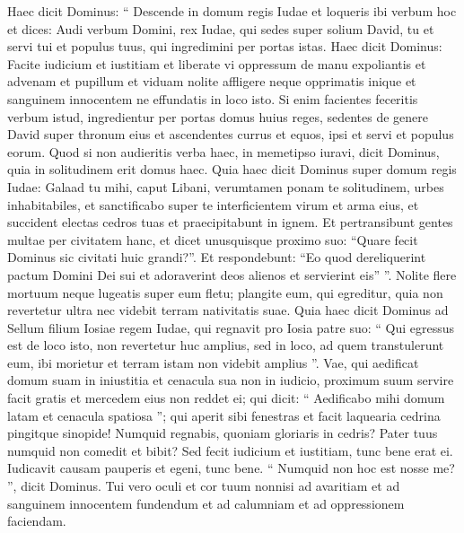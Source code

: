 \begin{biblechapter}
\begin{biblechapter}
\begin{biblechapter}
\begin{biblechapter}
\begin{biblechapter}
\begin{biblechapter}
\begin{biblechapter}
\begin{biblechapter}
\begin{biblechapter}
\begin{biblechapter}
\begin{biblechapter}
\begin{biblechapter}
\begin{biblechapter}
\begin{biblechapter}
\begin{biblechapter}
\begin{biblechapter}
\begin{biblechapter}
\begin{biblechapter}
\begin{biblechapter}
\begin{biblechapter}
\begin{biblechapter}
\begin{biblechapter}
\verse Haec dicit Dominus: “ Descende in domum regis Iudae et loqueris ibi verbum hoc 
\verse et dices: Audi verbum Domini, rex Iudae, qui sedes super solium David, tu et servi tui et populus tuus, qui ingredimini per portas istas. 
\verse Haec dicit Dominus: Facite iudicium et iustitiam et liberate vi oppressum de manu expoliantis et advenam et pupillum et viduam nolite affligere neque opprimatis inique et sanguinem innocentem ne effundatis in loco isto. 
\verse Si enim facientes feceritis verbum istud, ingredientur per portas domus huius reges, sedentes de genere David super thronum eius et ascendentes currus et equos, ipsi et servi et populus eorum. 
\verse Quod si non audieritis verba haec, in memetipso iuravi, dicit Dominus, quia in solitudinem erit domus haec.
 \verse Quia haec dicit Dominus super domum regis Iudae:
 Galaad tu mihi,
 caput Libani,
 verumtamen ponam te solitudinem,
 urbes inhabitabiles,
 \verse et sanctificabo super te
 interficientem virum et arma eius,
 et succident electas cedros tuas
 et praecipitabunt in ignem.
 \verse Et pertransibunt gentes multae per civitatem hanc, et dicet unusquisque proximo suo: “Quare fecit Dominus sic civitati huic grandi?”. 
\verse Et respondebunt: “Eo quod dereliquerint pactum Domini Dei sui et adoraverint deos alienos et servierint eis” ”.
 \verse Nolite flere mortuum
 neque lugeatis super eum fletu;
 plangite eum, qui egreditur,
 quia non revertetur ultra
 nec videbit terram nativitatis suae.
 \verse Quia haec dicit Dominus ad Sellum filium Iosiae regem Iudae, qui regnavit pro Iosia patre suo: “ Qui egressus est de loco isto, non revertetur huc amplius, 
\verse sed in loco, ad quem transtulerunt eum, ibi morietur et terram istam non videbit amplius ”.
 \verse Vae, qui aedificat domum suam in iniustitia
 et cenacula sua non in iudicio,
 proximum suum servire facit gratis
 et mercedem eius non reddet ei;
 \verse qui dicit: “ Aedificabo mihi domum latam
 et cenacula spatiosa ”;
 qui aperit sibi fenestras
 et facit laquearia cedrina
 pingitque sinopide!
 \verse Numquid regnabis,
 quoniam gloriaris in cedris?
 Pater tuus numquid non comedit et bibit?
 Sed fecit iudicium et iustitiam,
 tunc bene erat ei.
 \verse Iudicavit causam pauperis et egeni,
 tunc bene.
 “ Numquid non hoc est nosse me? ”,
 dicit Dominus.
 \verse Tui vero oculi et cor tuum nonnisi ad avaritiam
 et ad sanguinem innocentem fundendum
 et ad calumniam et ad oppressionem faciendam.

\end{biblechapter}
\end{biblechapter}
\end{biblechapter}
\end{biblechapter}
\end{biblechapter}
\end{biblechapter}
\end{biblechapter}
\end{biblechapter}
\end{biblechapter}
\end{biblechapter}
\end{biblechapter}
\end{biblechapter}
\end{biblechapter}
\end{biblechapter}
\end{biblechapter}
\end{biblechapter}
\end{biblechapter}
\end{biblechapter}
\end{biblechapter}
\end{biblechapter}
\end{biblechapter}
\end{biblechapter}
